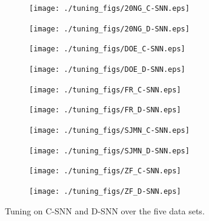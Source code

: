 \documentclass[smallextended]{svjour3}       %
\begin{document}
\begin{figure}[!htbp]
    \centering
    \begin{subfigure}[b]{0.37\textwidth}
        \texttt{[image: ./tuning\_figs/20NG\_C-SNN.eps]}
        \label{fig:20ng_tun_csnn}
    \end{subfigure}
    \begin{subfigure}[b]{0.37\textwidth}
        \texttt{[image: ./tuning\_figs/20NG\_D-SNN.eps]}
        \label{fig:20ng_tun_dsnn}
    \end{subfigure}
       \begin{subfigure}[b]{0.37\textwidth}
        \texttt{[image: ./tuning\_figs/DOE\_C-SNN.eps]}
        \label{fig:doe_tun_csnn}
    \end{subfigure}
    \begin{subfigure}[b]{0.37\textwidth}
        \texttt{[image: ./tuning\_figs/DOE\_D-SNN.eps]}
        \label{fig:doe_tun_dsnn}
    \end{subfigure}
    \begin{subfigure}[b]{0.37\textwidth}
        \texttt{[image: ./tuning\_figs/FR\_C-SNN.eps]}
        \label{fig:fr_tun_csnn}
    \end{subfigure}
    \begin{subfigure}[b]{0.37\textwidth}
        \texttt{[image: ./tuning\_figs/FR\_D-SNN.eps]}
        \label{fig:fr_tun_dsnn}
    \end{subfigure}
    \begin{subfigure}[b]{0.37\textwidth}
        \texttt{[image: ./tuning\_figs/SJMN\_C-SNN.eps]}
        \label{fig:sjmn_tun_csnn}
    \end{subfigure}
    \begin{subfigure}[b]{0.37\textwidth}
        \texttt{[image: ./tuning\_figs/SJMN\_D-SNN.eps]}
        \label{fig:sjmn_tun_dsnn}
    \end{subfigure}
    \begin{subfigure}[b]{0.37\textwidth}
        \texttt{[image: ./tuning\_figs/ZF\_C-SNN.eps]}
        \label{fig:zf_tun_csnn}
    \end{subfigure}
    \begin{subfigure}[b]{0.37\textwidth}
        \texttt{[image: ./tuning\_figs/ZF\_D-SNN.eps]}
        \label{fig:zf_tun_dsnn}
    \end{subfigure}
    \caption{Tuning on C-SNN and D-SNN over the five data sets.}\label{fig:tun_curves}
\end{figure}
\end{document}
